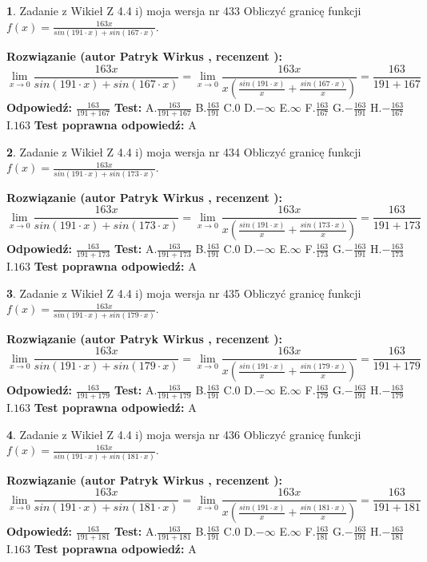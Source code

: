 \documentclass[12pt, a4paper]{article}
\theoremstyle{definition} %
\newtheorem{zad}{}
\newcommand{\zadStart}[1]{\begin{zad}#1\newline}
\newcommand{\zadStop}{\end{zad}}
\newcommand{\rozwStart}[2]{\noindent \textbf{Rozwiązanie (autor #1 , recenzent #2): }\newline}
\newcommand{\rozwStop}{\newline}
\newcommand{\odpStart}{\noindent \textbf{Odpowiedź:}\newline}
\newcommand{\odpStop}{\newline}
\newcommand{\testStart}{\noindent \textbf{Test:}\newline}
\newcommand{\testStop}{\newline}
\newcommand{\kluczStart}{\noindent \textbf{Test poprawna odpowiedź:}\newline}
\newcommand{\kluczStop}{\newline}
\begin{document}
\zadStart{Zadanie z Wikieł Z 4.4 i) moja wersja nr 433}
Obliczyć granicę funkcji $f(x)=\frac{163x}{sin(191\cdot x) +sin(167\cdot x)}$.
\zadStop
\rozwStart{Patryk Wirkus}{}
$$\lim\limits_{x\to 0}\frac{163x}{sin(191\cdot x) +sin(167\cdot x)}=\lim\limits_{x\to 0}\frac{163x}{x(\frac{sin(191\cdot x)}{x}+\frac{sin(167\cdot x)}{x})}=\frac{163}{191+167}$$
\rozwStop
\odpStart
$\frac{163}{191+167}$
\odpStop
\testStart
A.$\frac{163}{191+167}$
B.$\frac{163}{191}$
C.$0$
D.$-\infty$
E.$\infty$
F.$\frac{163}{167}$
G.$-\frac{163}{191}$
H.$-\frac{163}{167}$
I.$163$
\testStop
\kluczStart
A
\kluczStop



\zadStart{Zadanie z Wikieł Z 4.4 i) moja wersja nr 434}
Obliczyć granicę funkcji $f(x)=\frac{163x}{sin(191\cdot x) +sin(173\cdot x)}$.
\zadStop
\rozwStart{Patryk Wirkus}{}
$$\lim\limits_{x\to 0}\frac{163x}{sin(191\cdot x) +sin(173\cdot x)}=\lim\limits_{x\to 0}\frac{163x}{x(\frac{sin(191\cdot x)}{x}+\frac{sin(173\cdot x)}{x})}=\frac{163}{191+173}$$
\rozwStop
\odpStart
$\frac{163}{191+173}$
\odpStop
\testStart
A.$\frac{163}{191+173}$
B.$\frac{163}{191}$
C.$0$
D.$-\infty$
E.$\infty$
F.$\frac{163}{173}$
G.$-\frac{163}{191}$
H.$-\frac{163}{173}$
I.$163$
\testStop
\kluczStart
A
\kluczStop



\zadStart{Zadanie z Wikieł Z 4.4 i) moja wersja nr 435}
Obliczyć granicę funkcji $f(x)=\frac{163x}{sin(191\cdot x) +sin(179\cdot x)}$.
\zadStop
\rozwStart{Patryk Wirkus}{}
$$\lim\limits_{x\to 0}\frac{163x}{sin(191\cdot x) +sin(179\cdot x)}=\lim\limits_{x\to 0}\frac{163x}{x(\frac{sin(191\cdot x)}{x}+\frac{sin(179\cdot x)}{x})}=\frac{163}{191+179}$$
\rozwStop
\odpStart
$\frac{163}{191+179}$
\odpStop
\testStart
A.$\frac{163}{191+179}$
B.$\frac{163}{191}$
C.$0$
D.$-\infty$
E.$\infty$
F.$\frac{163}{179}$
G.$-\frac{163}{191}$
H.$-\frac{163}{179}$
I.$163$
\testStop
\kluczStart
A
\kluczStop



\zadStart{Zadanie z Wikieł Z 4.4 i) moja wersja nr 436}
Obliczyć granicę funkcji $f(x)=\frac{163x}{sin(191\cdot x) +sin(181\cdot x)}$.
\zadStop
\rozwStart{Patryk Wirkus}{}
$$\lim\limits_{x\to 0}\frac{163x}{sin(191\cdot x) +sin(181\cdot x)}=\lim\limits_{x\to 0}\frac{163x}{x(\frac{sin(191\cdot x)}{x}+\frac{sin(181\cdot x)}{x})}=\frac{163}{191+181}$$
\rozwStop
\odpStart
$\frac{163}{191+181}$
\odpStop
\testStart
A.$\frac{163}{191+181}$
B.$\frac{163}{191}$
C.$0$
D.$-\infty$
E.$\infty$
F.$\frac{163}{181}$
G.$-\frac{163}{191}$
H.$-\frac{163}{181}$
I.$163$
\testStop
\kluczStart
A
\kluczStop
\end{document}
